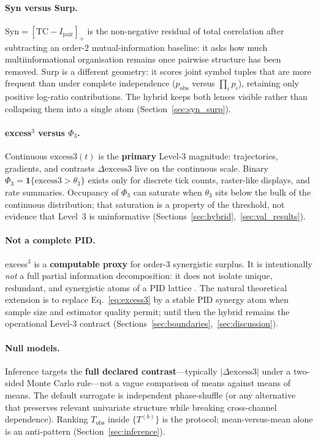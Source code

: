 \documentclass[11pt,a4paper]{article}
\begin{document}
\paragraph{Syn versus Surp.}
$\mathrm{Syn}=[\mathrm{TC}-I_{\mathrm{pair}}]_+$ is the non-negative residual
of total correlation after subtracting an order-2 mutual-information
baseline: it asks how much multiinformational organisation remains once
pairwise structure has been removed. $\mathrm{Surp}$ is a different
geometry: it scores joint symbol tuples that are more frequent than under
complete independence ($p_{\mathrm{obs}}$ versus $\prod_i p_i$), retaining
only positive log-ratio contributions. The hybrid keeps both lenses visible
rather than collapsing them into a single atom
(Section~\ref{sec:syn_surp}).

\paragraph{excess$^3$ versus $\Phi_3$.}
Continuous $\mathrm{excess3}(t)$ is the \textbf{primary} Level-3 magnitude:
trajectories, gradients, and contrasts $\Delta\mathrm{excess3}$ live on the
continuous scale. Binary $\Phi_3=\mathbf{1}\{\mathrm{excess3}>\theta_3\}$
exists only for discrete tick counts, raster-like displays, and rate
summaries. Occupancy of $\Phi_3$ can saturate when $\theta_3$ sits below the
bulk of the continuous distribution; that saturation is a property of the
threshold, not evidence that Level~3 is uninformative
(Sections~\ref{sec:hybrid},~\ref{sec:val_results}).

\paragraph{Not a complete PID.}
excess$^3$ is a \textbf{computable proxy} for order-3 synergistic surplus.
It is intentionally \emph{not} a full partial information decomposition: it
does not isolate unique, redundant, and synergistic atoms of a PID lattice
\citep{Williams2010,Bertschinger2014}. The natural theoretical extension is
to replace Eq.~\eqref{eq:excess3} by a stable PID synergy atom when sample
size and estimator quality permit; until then the hybrid remains the
operational Level-3 contract
(Sections~\ref{sec:boundaries},~\ref{sec:discussion}).

\paragraph{Null models.}
Inference targets the \textbf{full declared contrast}---typically
$|\Delta\mathrm{excess3}|$ under a two-sided Monte Carlo rule---not a vague
comparison of means against means of means. The default surrogate is
independent phase-shuffle (or any alternative that preserves relevant
univariate structure while breaking cross-channel dependence). Ranking
$T_{\mathrm{obs}}$ inside $\{T^{(b)}\}$ is the protocol; mean-versus-mean
alone is an anti-pattern (Section~\ref{sec:inference}).
\end{document}

